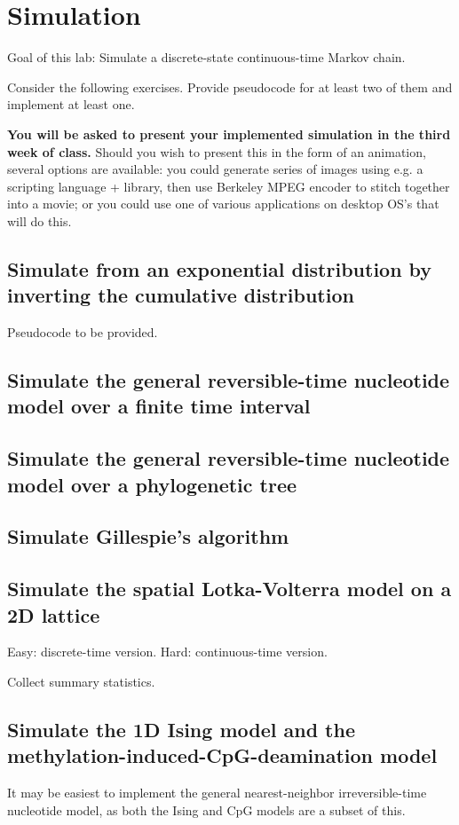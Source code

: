 \chapter{Simulation}

Goal of this lab:
Simulate a discrete-state continuous-time Markov chain.

Consider the following exercises.
Provide pseudocode for at least two of them and implement at least one.

{\bf You will be asked to present your implemented simulation in the third week of class.}
Should you wish to present this in the form of an animation, several options are available:
you could generate series of images using e.g. a scripting language + library,
then use Berkeley MPEG encoder to stitch together into a movie;
or you could use one of various applications on desktop OS's that will do this.

\section{Simulate from an exponential distribution by inverting the cumulative distribution}

Pseudocode to be provided.

\section{Simulate the general reversible-time nucleotide model over a finite time interval}

\section{Simulate the general reversible-time nucleotide model over a phylogenetic tree}

\section{Simulate Gillespie's algorithm}

\cite{Gillespie77}

\section{Simulate the spatial Lotka-Volterra model on a 2D lattice}

Easy: discrete-time version.
Hard: continuous-time version.

Collect summary statistics.

\section{Simulate the 1D Ising model and the methylation-induced-CpG-deamination model}

It may be easiest to implement the general nearest-neighbor irreversible-time nucleotide model,
as both the Ising and CpG models are a subset of this.

